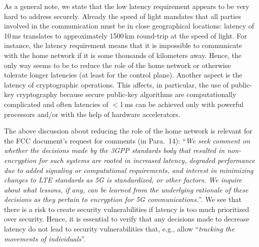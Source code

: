 \documentclass[12pt]{llncs}
\newcommand\ques[1]{``\emph{#1}''}
\begin{document}
As a general note, we state that the low latency requirement appears to be very hard to address securely. Already the speed of light mandates that all parties involved in the communication must be in close geographical locations: latency of 10\,ms translates to approximately 1500\,km round-trip at the speed of light. For instance, the latency requirement means that it is impossible to communicate with the home network if it is some thousands of kilometers away. Hence, the only way seems to be to reduce the role of the home network or otherwise tolerate longer latencies (at least for the control plane). Another aspect is the latency of cryptographic operations. This affects, in particular, the use of public-key cryptography because secure public-key algorithms are computationally complicated and often latencies of $<$1\,ms can be achieved only with powerful processors and/or with the help of hardware accelerators. 

The above discussion about reducing the role of the home network is relevant for the FCC document's request for comments (in Para.~14): \ques{We seek comment on whether the decisions made by the 3GPP standards body that resulted in non-encryption for such systems are rooted in increased latency, degraded performance due to added signaling or computational requirements, and interest in minimizing changes to LTE standards as 5G is standardized, or other factors. We inquire about what lessons, if any, can be learned from the underlying rationale of these decisions as they pertain to encryption for 5G communications.}. We see that there is a risk to create security vulnerabilities if latency is too much prioritized over security. Hence, it is essential to verify that any decisions made to decrease latency do not lead to security vulnerabilities that, e.g., allow \ques{tracking the movements of individuals}.
\end{document}
